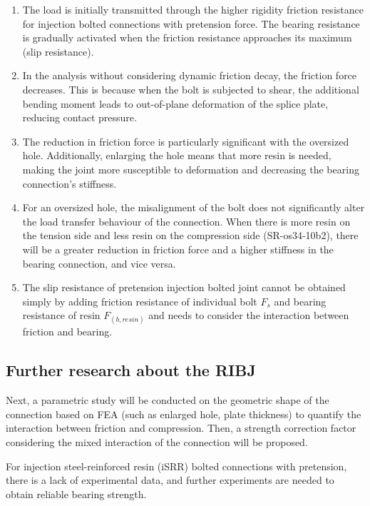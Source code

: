 \begin{enumerate}
    \item The load is initially transmitted through the higher rigidity friction resistance for injection bolted connections with pretension force. The bearing resistance is gradually activated when the friction resistance approaches its maximum (slip resistance).
    
    \item In the analysis without considering dynamic friction decay, the friction force decreases. This is because when the bolt is subjected to shear, the additional bending moment leads to out-of-plane deformation of the splice plate, reducing contact pressure. 
    
    \item The reduction in friction force is particularly significant with the oversized hole. Additionally, enlarging the hole means that more resin is needed, making the joint more susceptible to deformation and decreasing the bearing connection's stiffness.

    \item For an oversized hole, the misalignment of the bolt does not significantly alter the load transfer behaviour of the connection. When there is more resin on the tension side and less resin on the compression side (SR-os34-10b2), there will be a greater reduction in friction force and a higher stiffness in the bearing connection, and vice versa.
    
    \item The slip resistance of pretension injection bolted joint cannot be obtained simply by adding friction resistance of individual bolt $F_s$ and bearing resistance of resin $F_{(b,resin)}$ and needs to consider the interaction between friction and bearing.

    
\end{enumerate}

\subsection{Further research about the RIBJ}

Next, a parametric study will be conducted on the geometric shape of the connection based on FEA (such as enlarged hole, plate thickness) to quantify the interaction between friction and compression. Then, a strength correction factor considering the mixed interaction of the connection will be proposed.

For injection steel-reinforced resin (iSRR) bolted connections with pretension, there is a lack of experimental data, and further experiments are needed to obtain reliable bearing strength. 


